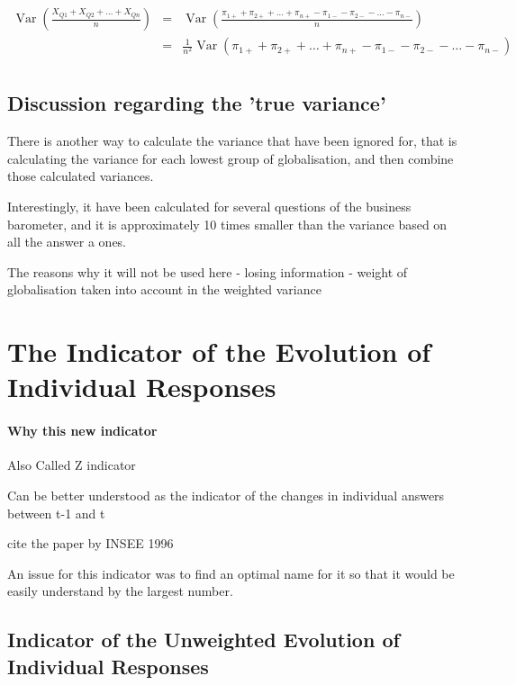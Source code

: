 \documentclass[12pt,a4paper,oneside]{book}
\DeclareMathOperator{\Var}{Var}
\begin{document}
\begin{eqnarray}
    \Var \left(\frac{X_{Q1} + X_{Q2} + \ldots + X_{Qn}}{n} \right) 
    &=& \Var \left(\frac{\pi_{1+} + \pi_{2+} + \ldots + \pi_{n+} - \pi_{1-} - \pi_{2-} - \ldots - \pi_{n-} }{n} \right) \nonumber \\
    &=& \frac{1}{n^2} \Var \left(\pi_{1+} + \pi_{2+} + \ldots + \pi_{n+} - \pi_{1-} - \pi_{2-} - \ldots - \pi_{n-} \right) \nonumber \\
\end{eqnarray}


\section{Discussion regarding the 'true variance'}

There is another way to calculate the variance that have been ignored for, that is calculating the variance for each lowest group of globalisation, and then combine those calculated variances.


Interestingly, it have been calculated for several questions of the business barometer, and it is approximately 10 times smaller than the variance based on all the answer a ones.



The reasons why it will not be used here
- losing information
- weight of globalisation taken into account in the weighted variance




\chapter{The Indicator of the Evolution of Individual Responses}

 \subsubsection{Why this new indicator}

Also Called Z indicator

Can be better understood as the indicator of the changes in individual answers between t-1 and t

cite the paper by INSEE 1996 \cite{caron_estimation_1996}

An issue for this indicator was to find an optimal name for it so that it would be easily understand by the largest number.
 

\section{Indicator of the Unweighted Evolution of Individual Responses}
\end{document}
